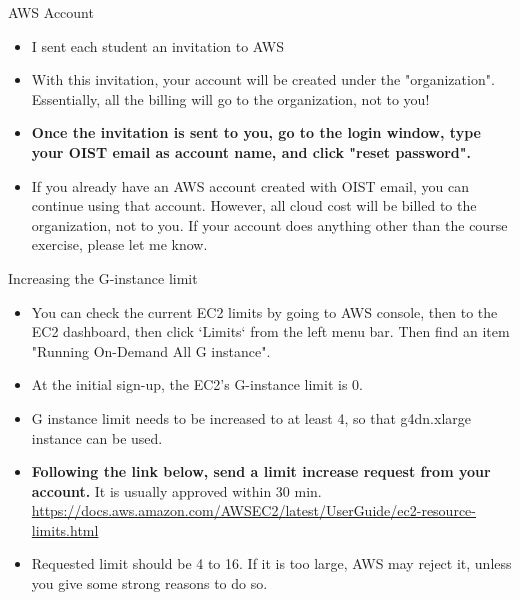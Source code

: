 \documentclass[unicode,11pt]{beamer}
\begin{document}
\begin{frame}{AWS Account}

\begin{itemize}
    \item I sent each student an invitation to AWS
    \item With this invitation, your account will be created under the "organization".
    Essentially, all the billing will go to the organization, not to you!
    \item \textbf{Once the invitation is sent to you, go to the login window, type your OIST email as account name, and click "reset password".}
    \item If you already have an AWS account created with OIST email, you can continue using that account.
    However, all cloud cost will be billed to the organization, not to you.
    If your account does anything other than the course exercise, please let me know.
\end{itemize}

\end{frame}

\begin{frame}{Increasing the G-instance limit}

\begin{itemize}
    \item You can check the current EC2 limits by going to AWS console, then to the EC2 dashboard, then click `Limits` from the left menu bar.
    Then find an item "Running On-Demand All G instance".
    \item At the initial sign-up, the EC2's G-instance limit is 0.
    \item G instance limit needs to be increased to at least 4, so that g4dn.xlarge instance can be used.
    \item \textbf{Following the link below, send a limit increase request from your account.}
    It is usually approved within 30 min.
    \url{https://docs.aws.amazon.com/AWSEC2/latest/UserGuide/ec2-resource-limits.html}
    \item Requested limit should be 4 to 16.
    If it is too large, AWS may reject it, unless you give some strong reasons to do so.
\end{itemize}

\end{frame}
\end{document}
